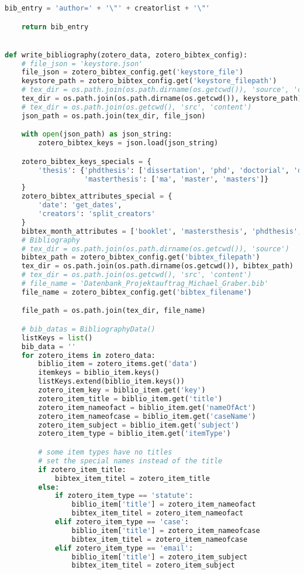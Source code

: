 \begin{lstlisting}[language=python, caption=Python LaTex - zotero.py - Zotero BibLaTex Importer,captionpos=b,label={lst:zotero},breaklines=true]
    bib_entry = 'author=' + '\"' + creatorlist + '\"'

    return bib_entry


def write_bibliography(zotero_data, zotero_bibtex_config):
    # file_json = 'keystore.json'
    file_json = zotero_bibtex_config.get('keystore_file')
    keystore_path = zotero_bibtex_config.get('keystore_filepath')
    # tex_dir = os.path.join(os.path.dirname(os.getcwd()), 'source', 'configuration')
    tex_dir = os.path.join(os.path.dirname(os.getcwd()), keystore_path)
    # tex_dir = os.path.join(os.getcwd(), 'src', 'content')
    json_path = os.path.join(tex_dir, file_json)

    with open(json_path) as json_string:
        zotero_bibtex_keys = json.load(json_string)

    zotero_bibtex_keys_specials = {
        'thesis': {'phdthesis': ['dissertation', 'phd', 'doctorial', 'doctor', 'doktor', 'doktorarbeit'],
                   'masterthesis': ['ma', 'master', 'masters']}
    }
    zotero_bibtex_attributes_special = {
        'date': 'get_dates',
        'creators': 'split_creators'
    }
    bibtex_month_attributes = ['booklet', 'mastersthesis', 'phdthesis', 'techreport']
    # Bibliography
    # tex_dir = os.path.join(os.path.dirname(os.getcwd()), 'source')
    bibtex_path = zotero_bibtex_config.get('bibtex_filepath')
    tex_dir = os.path.join(os.path.dirname(os.getcwd()), bibtex_path)
    # tex_dir = os.path.join(os.getcwd(), 'src', 'content')
    # file_name = 'Datenbank_Projektauftrag_Michael_Graber.bib'
    file_name = zotero_bibtex_config.get('bibtex_filename')

    file_path = os.path.join(tex_dir, file_name)

    # bib_datas = BibliographyData()
    listKeys = list()
    bib_data = ''
    for zotero_items in zotero_data:
        biblio_item = zotero_items.get('data')
        itemkeys = biblio_item.keys()
        listKeys.extend(biblio_item.keys())
        zotero_item_key = biblio_item.get('key')
        zotero_item_title = biblio_item.get('title')
        zotero_item_nameofact = biblio_item.get('nameOfAct')
        zotero_item_nameofcase = biblio_item.get('caseName')
        zotero_item_subject = biblio_item.get('subject')
        zotero_item_type = biblio_item.get('itemType')

        # some item types have no titles
        # set the special names instead of the title
        if zotero_item_title:
            bibtex_item_titel = zotero_item_title
        else:
            if zotero_item_type == 'statute':
                biblio_item['title'] = zotero_item_nameofact
                bibtex_item_titel = zotero_item_nameofact
            elif zotero_item_type == 'case':
                biblio_item['title'] = zotero_item_nameofcase
                bibtex_item_titel = zotero_item_nameofcase
            elif zotero_item_type == 'email':
                biblio_item['title'] = zotero_item_subject
                bibtex_item_titel = zotero_item_subject


\end{lstlisting}
